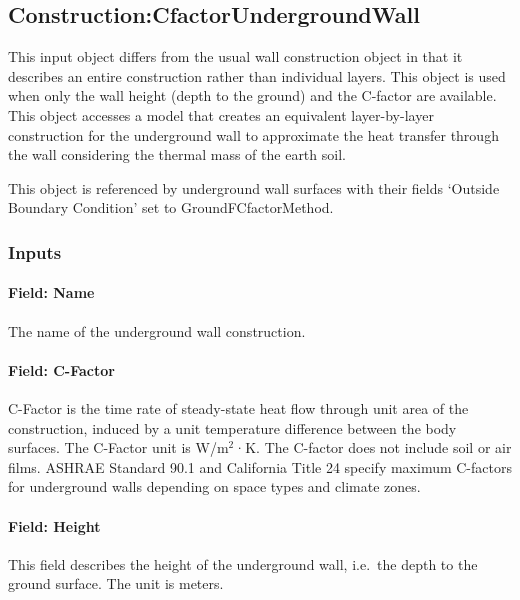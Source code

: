 \subsection{Construction:CfactorUndergroundWall}\label{constructioncfactorundergroundwall}

This input object differs from the usual wall construction object in that it describes an entire construction rather than individual layers. This object is used when only the wall height (depth to the ground) and the C-factor are available.~ This object accesses a model that creates an equivalent layer-by-layer construction for the underground wall to approximate the heat transfer through the wall considering the thermal mass of the earth soil.

This object is referenced by underground wall surfaces with their fields `Outside Boundary Condition' set to GroundFCfactorMethod.

\subsubsection{Inputs}\label{inputs-36}

\paragraph{Field: Name}\label{field-name-29-000}

The name of the underground wall construction.

\paragraph{Field: C-Factor}\label{field-c-factor}

C-Factor is the time rate of steady-state heat flow through unit area of the construction, induced by a unit temperature difference between the body surfaces. The C-Factor unit is W/m\(^{2}\)·K. The C-factor does not include soil or air films. ASHRAE Standard 90.1 and California Title 24 specify maximum C-factors for underground walls depending on space types and climate zones.

\paragraph{Field: Height}\label{field-height}

This field describes the height of the underground wall, i.e.~the depth to the ground surface. The unit is meters.

